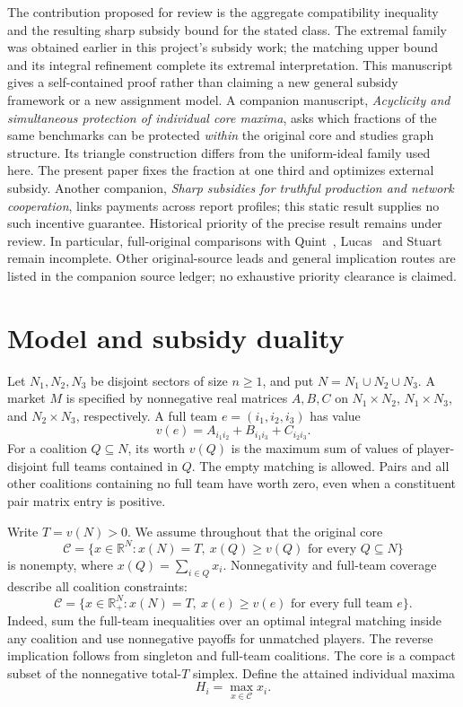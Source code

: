\documentclass[11pt]{article}
\theoremstyle{remark}
\newcommand{\R}{\mathbb R}
\newcommand{\core}{\mathcal C}
\begin{document}
The contribution proposed for review is the aggregate compatibility
inequality and the resulting sharp subsidy bound for the stated class.
The extremal family was obtained earlier in this project's subsidy work;
the matching upper bound and its integral refinement complete its extremal
interpretation. This manuscript gives a self-contained proof rather than
claiming a new general subsidy framework or a new assignment model.
A companion manuscript, \emph{Acyclicity and simultaneous protection of
individual core maxima}, asks which fractions of the same benchmarks can
be protected \emph{within} the original core and studies graph structure.
Its triangle construction differs from the uniform-ideal family used here.
The present paper fixes the fraction at one third and optimizes external
subsidy. Another companion, \emph{Sharp subsidies for truthful production
and network cooperation}, links payments across report profiles; this
static result supplies no such incentive guarantee.
Historical priority of the precise result remains under review. In
particular, full-original comparisons with Quint~\citep{Quint1991},
Lucas~\citep{Lucas1995} and Stuart~\citep{Stuart1997} remain incomplete.
Other original-source leads and general implication routes are listed in
the companion source ledger; no exhaustive priority clearance is claimed.

\section{Model and subsidy duality}\label{sec:model}
Let $N_1,N_2,N_3$ be disjoint sectors of size $n\ge1$, and put
$N=N_1\cup N_2\cup N_3$. A market $M$ is specified by nonnegative real
matrices $A,B,C$ on $N_1\times N_2$, $N_1\times N_3$, and
$N_2\times N_3$, respectively. A full team $e=(i_1,i_2,i_3)$ has value
\begin{equation}\label{eq:team}
                  v(e)=A_{i_1i_2}+B_{i_1i_3}+C_{i_2i_3}.
\end{equation}
For a coalition $Q\subseteq N$, its worth $v(Q)$ is the maximum sum of
values of player-disjoint full teams contained in $Q$. The empty matching
is allowed. Pairs and all other coalitions containing no full team have
worth zero, even when a constituent pair matrix entry is positive.

Write $T=v(N)>0$. We assume throughout that the original core
\[
 \core=\{x\in\R^N:x(N)=T,\ x(Q)\ge v(Q)\text{ for every }Q\subseteq N\}
\]
is nonempty, where $x(Q)=\sum_{i\in Q}x_i$.
Nonnegativity and full-team coverage describe all coalition constraints:
\begin{equation}\label{eq:core}
 \core=\{x\in\R_+^N:x(N)=T,\ x(e)\ge v(e)\text{ for every full team }e\}.
\end{equation}
Indeed, sum the full-team inequalities over an optimal integral matching
inside any coalition and use nonnegative payoffs for unmatched players.
The reverse implication follows from singleton and full-team coalitions.
The core is a compact subset of the nonnegative total-$T$ simplex. Define
the attained individual maxima
\begin{equation}\label{eq:ideals}
                        H_i=\max_{x\in\core}x_i.
\end{equation}
\end{document}

